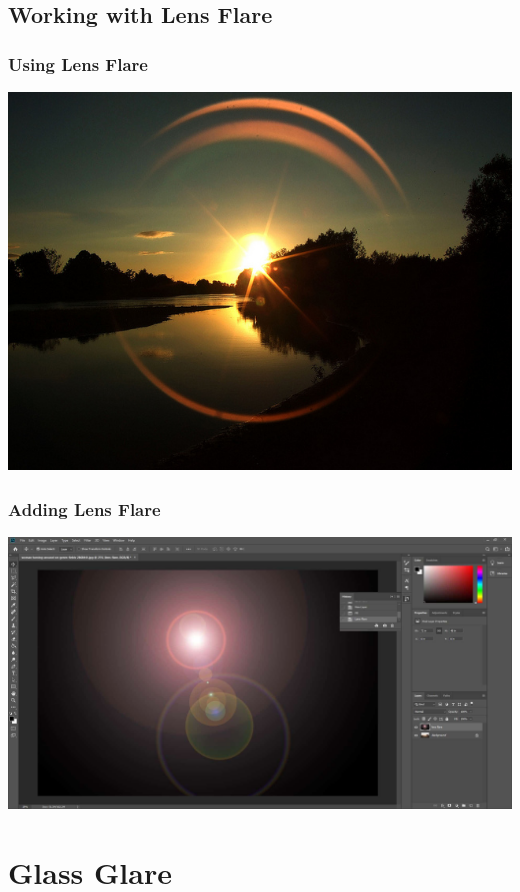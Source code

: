 \documentclass{beamer}
\begin{document}
		\subsection{Working with Lens Flare}		
\begin{frame}
	\frametitle{Using Lens Flare}
				\begin{center}
	\includegraphics[width=1.0\textwidth]{images/Beautiful Lens Flare Photographs (11).jpg}
\end{center}
\end{frame}
		
\begin{frame}
	\frametitle{Adding Lens Flare}
	\begin{center}
		\includegraphics[width=1.0\textwidth]{images/lens-flare-14.jpg}
	\end{center}
\end{frame}
			
	\section{Glass Glare}
\end{document}
